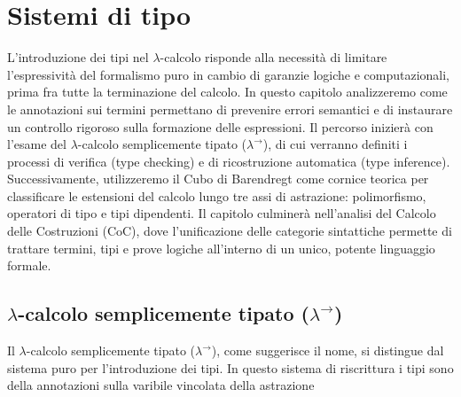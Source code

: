 \chapter{Sistemi di tipo}
\label{chap:type_systems}

L'introduzione dei tipi nel $\lambda$-calcolo risponde alla necessità di limitare l'espressività del formalismo puro in cambio di garanzie logiche e computazionali, 
prima fra tutte la terminazione del calcolo. In questo capitolo analizzeremo come le annotazioni sui termini permettano di prevenire errori semantici e di instaurare 
un controllo rigoroso sulla formazione delle espressioni. Il percorso inizierà con l'esame del $\lambda$-calcolo semplicemente tipato ($\lambda^{\to}$), di cui verranno 
definiti i processi di verifica (type checking) e di ricostruzione automatica (type inference). Successivamente, utilizzeremo il Cubo di Barendregt come cornice teorica 
per classificare le estensioni del calcolo lungo tre assi di astrazione: polimorfismo, operatori di tipo e tipi dipendenti. Il capitolo culminerà nell'analisi del Calcolo 
delle Costruzioni (CoC), dove l'unificazione delle categorie sintattiche permette di trattare termini, tipi e prove logiche all'interno di un unico, potente linguaggio formale.

\section{\texorpdfstring{$\lambda$}{Lambda}-calcolo semplicemente tipato (\texorpdfstring{$\lambda^{\to}$}{Lambda-to})}
Il $\lambda$-calcolo semplicemente tipato ($\lambda^{\to}$), come suggerisce il nome, si distingue dal sistema puro per l'introduzione dei tipi.
In questo sistema di riscrittura i tipi sono della annotazioni sulla varibile vincolata della astrazione

